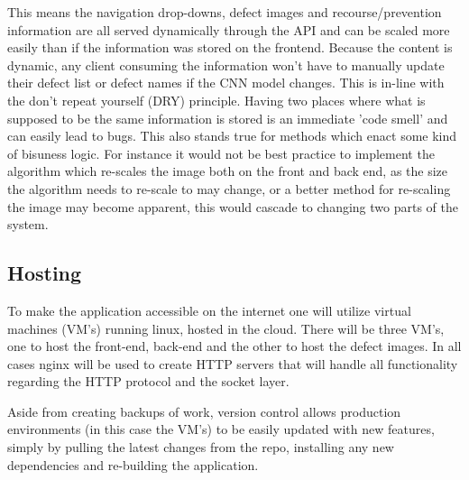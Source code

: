       This means the navigation drop-downs, defect images and recourse/prevention information are all served dynamically through the API and can be scaled more easily than if the information was stored on the frontend. Because the content is dynamic, any client consuming the information won't have to manually update their defect list or defect names if the CNN model changes. This is in-line with the don't repeat yourself (DRY) principle. Having two places where what is supposed to be the same information is stored is an immediate 'code smell' and can easily lead to bugs. This also stands true for methods which enact some kind of bisuness logic. For instance it would not be best practice to implement the algorithm which re-scales the image both on the front and back end, as the size the algorithm needs to re-scale to may change, or a better method for re-scaling the image may become apparent, this would cascade to changing two parts of the system.


    \subsection{Hosting}
      To make the application accessible on the internet one will utilize virtual machines (VM's) running linux, hosted in the cloud. There will be three VM's, one to host the front-end, back-end and the other to host the defect images. In all cases nginx will be used to create HTTP servers that will handle all functionality regarding the HTTP protocol and the socket layer.
      \par
      Aside from creating backups of work, version control allows production environments (in this case the VM's) to be easily updated with new features, simply by pulling the latest changes from the repo, installing any new dependencies and re-building the application.


